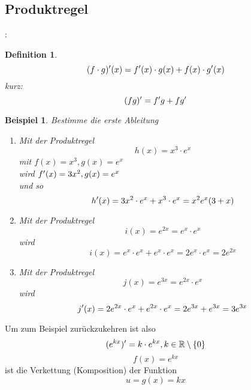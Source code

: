 \documentclass{report}
\newtheorem{mydef}{Definition}
\newtheorem{myexample}{Beispiel}
\begin{document}
\subsection{Produktregel}:
\begin{mydef}
\begin{equation}
(f \cdot g)\rq{}(x) = f\rq{}(x) \cdot g(x) + f(x) \cdot g\rq{}(x)
\end{equation}
kurz:
\begin{equation}
(fg)\rq{} = f\rq{}g + fg\rq{}
\end{equation}
\end{mydef}
\begin{myexample}
Bestimme die erste Ableitung
\begin{enumerate}
\item Mit der Produktregel
\begin{equation}
h(x) = x^3 \cdot e^x
\end{equation}
mit $f(x) = x^3, g(x) = e^x$\\
wird $f\rq{}(x) = 3x^2, g(x) = e^x$\\
und so
\begin{equation}
h\rq{}(x) = 3x^2 \cdot e^x + x^3 \cdot e^x = x^2 e^x (3 + x)
\end{equation}
\item Mit der Produktregel
\begin{equation}
i(x) = e^{2x} = e^x \cdot e^x
\end{equation}
wird
\begin{equation}
i(x) = e^x \cdot e^x + e^x \cdot e^x = 2e^x \cdot e^x = 2e^{2x}
\end{equation}
\item Mit der Produktregel
\begin{equation}
j(x) = e^{3x} = e^{2x} \cdot e^{x}
\end{equation}
wird
\begin{equation}
j\rq{}(x) = 2e^{2x} \cdot e^x + e^{2x} \cdot e^x = 2e^{3x} + e^{3x} = 3e^{3x}
\end{equation}
\end{enumerate}
\end{myexample}
Um zum Beispiel zurückzukehren ist also
\begin{equation}
(e^{kx})\rq{} = k \cdot e^{kx}, k \in \mathbb{R} \setminus \{0\}
\end{equation}
\begin{equation}
f(x) = e^{kx}
\end{equation}
ist die Verkettung (Komposition) der Funktion
\begin{equation}
u = g(x) = kx
\end{equation}
\end{document}
